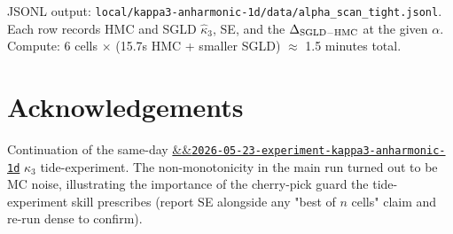 \documentclass[11pt]{article}
\newcommand{\experimentref}[2][]{\href{https://therisensea.org/experiments/#2/}{\ifx&#1&\texttt{#2}\else#1\fi}}
\begin{document}
JSONL output: \texttt{local/kappa3-anharmonic-1d/data/alpha\_scan\_tight.jsonl}.
Each row records HMC and SGLD $\hat\kappa_3$, SE, and the
$\Delta_{\rm SGLD-HMC}$ at the given $\alpha$. Compute: 6 cells
$\times$ (15.7s HMC + smaller SGLD) $\approx$ 1.5 minutes total.

\section*{Acknowledgements}

Continuation of the same-day \experimentref{2026-05-23-experiment-kappa3-anharmonic-1d}
$\kappa_3$ tide-experiment. The non-monotonicity in the main run
turned out to be MC noise, illustrating the importance of the
cherry-pick guard the tide-experiment skill prescribes (report SE
alongside any "best of $n$ cells" claim and re-run dense to confirm).
\end{document}

